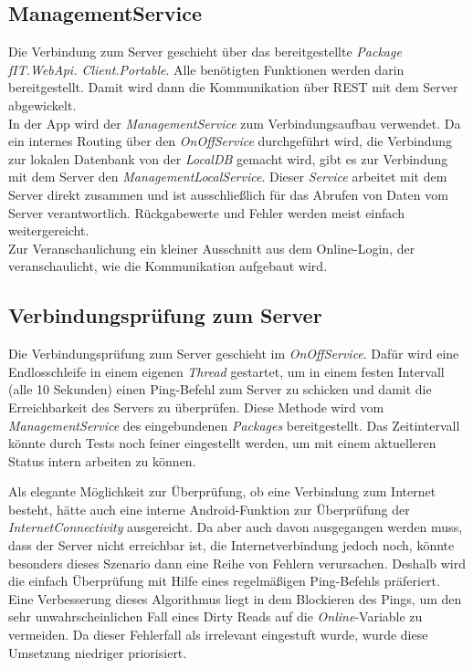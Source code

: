 \subsection{ManagementService}
\label{ssec:nat-ManagementServiceLocal}
Die Verbindung zum Server geschieht über das bereitgestellte \textit{Package} \linebreak \textit{fIT.WebApi. Client.Portable}. Alle benötigten Funktionen werden darin bereitgestellt. Damit wird dann die Kommunikation über REST mit dem Server abgewickelt.\\
In der App wird der \textit{ManagementService} zum Verbindungsaufbau verwendet. Da ein internes Routing über den \textit{OnOffService} durchgeführt wird, die Verbindung zur lokalen Datenbank von der \textit{LocalDB} gemacht wird, gibt es zur Verbindung mit dem Server den \textit{ManagementLocalService}. Dieser \textit{Service} arbeitet mit dem Server direkt zusammen und ist ausschließlich für das Abrufen von Daten vom Server verantwortlich. Rückgabewerte und Fehler werden meist einfach weitergereicht.\\
Zur Veranschaulichung ein kleiner Ausschnitt aus dem Online-Login, der veranschaulicht, wie die Kommunikation aufgebaut wird.

\subsection{Verbindungsprüfung zum Server}
\label{ssec:nat-konnektivität}
Die Verbindungsprüfung zum Server geschieht im \textit{OnOffService}. Dafür wird eine Endlosschleife in einem eigenen \textit{Thread} gestartet, um in einem festen Intervall (alle 10 Sekunden) einen Ping-Befehl zum Server zu schicken und damit die Erreichbarkeit des Servers zu überprüfen. Diese Methode wird vom \textit{ManagementService} des eingebundenen \textit{Packages} bereitgestellt. Das Zeitintervall könnte durch Tests noch feiner eingestellt werden, um mit einem aktuelleren Status intern arbeiten zu können.

Als elegante Möglichkeit zur Überprüfung, ob eine Verbindung zum Internet besteht, hätte auch eine interne Android-Funktion zur Überprüfung der \textit{InternetConnectivity} ausgereicht. Da aber auch davon ausgegangen werden muss, dass der Server nicht erreichbar ist, die Internetverbindung jedoch noch, könnte besonders dieses Szenario dann eine Reihe von Fehlern verursachen. Deshalb wird die einfach Überprüfung mit Hilfe eines regelmäßigen Ping-Befehls präferiert.\\
Eine Verbesserung dieses Algorithmus liegt in dem Blockieren des Pings, um den sehr unwahrscheinlichen Fall eines \glspl{Dirty Read} auf die \textit{Online}-Variable zu vermeiden. Da dieser Fehlerfall als irrelevant eingestuft wurde, wurde diese Umsetzung niedriger priorisiert.
